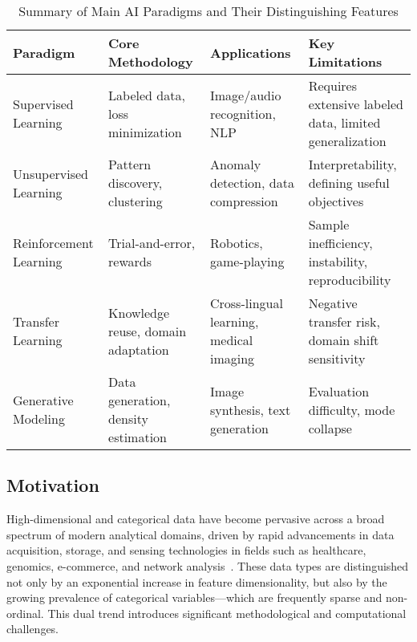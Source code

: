 \documentclass[sigconf]{acmart}
\begin{document}
\begin{table*}[htbp]
\centering
\caption{Summary of Main AI Paradigms and Their Distinguishing Features}
\label{tab:main-paradigms}
\begin{adjustbox}{max width=\textwidth}
\begin{tabular}{@{}llll@{}}
\toprule
\textbf{Paradigm} & \textbf{Core Methodology} & \textbf{Applications} & \textbf{Key Limitations} \\
\midrule
Supervised Learning & Labeled data, loss minimization & Image/audio recognition, NLP & Requires extensive labeled data, limited generalization \\
Unsupervised Learning & Pattern discovery, clustering & Anomaly detection, data compression & Interpretability, defining useful objectives \\
Reinforcement Learning & Trial-and-error, rewards & Robotics, game-playing & Sample inefficiency, instability, reproducibility \\
Transfer Learning & Knowledge reuse, domain adaptation & Cross-lingual learning, medical imaging & Negative transfer risk, domain shift sensitivity \\
Generative Modeling & Data generation, density estimation & Image synthesis, text generation & Evaluation difficulty, mode collapse \\
\bottomrule
\end{tabular}
\end{adjustbox}
\end{table*}

\subsection{Motivation}

High-dimensional and categorical data have become pervasive across a broad spectrum of modern analytical domains, driven by rapid advancements in data acquisition, storage, and sensing technologies in fields such as healthcare, genomics, e-commerce, and network analysis~\cite{ref1,ref2,ref5,ref6,ref11,ref12,ref30,ref32,ref36,ref37,ref38,ref39,ref42,ref43,ref46,ref52,ref71,ref72,ref73,ref76,ref90,ref93,ref96,ref110}. These data types are distinguished not only by an exponential increase in feature dimensionality, but also by the growing prevalence of categorical variables—which are frequently sparse and non-ordinal. This dual trend introduces significant methodological and computational challenges.
\end{document}

